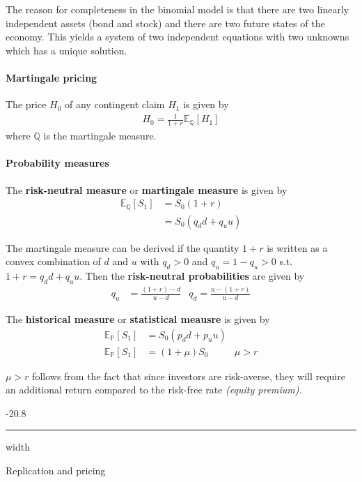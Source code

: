 \documentclass[a4paper,landscape,7pt,fleqn]{scrartcl}
\makeatletter
\renewcommand{\emph}[1]{\textbf{#1}}
\renewcommand{\subsubsection}{\@startsection{subsubsection}{1}{0mm}%
{-2\baselineskip}{0.8\baselineskip}%
{\hrule depth 0.2pt width\columnwidth\vspace*{1.2em}\normalsize\bfseries}}
\makeatother
\begin{document}
\begin{multicols*}{3}
The reason for completeness in the binomial model is that there are two linearly independent assets (bond and stock) and there are two future states of the economy. This yields a system of two independent equations with two unknowns which has a unique solution.

\paragraph{Martingale pricing}
The price $H_0$ of any contingent claim $H_1$ is given by
\begin{align*}
H_0 = \frac{1}{1+r} \mathbb{E}_\mathbb{Q}[H_1]
\end{align*}
where $\mathbb{Q}$ is the martingale measure.

\paragraph{Probability measures}
The \emph{risk-neutral measure} or \emph{martingale measure} is given by
\begin{align*}
\mathbb{E}_\mathbb{Q}[S_1] &= S_0 (1+r) \\
&= S_0 (q_d d + q_u u)
\end{align*}

The martingale measure can be derived if the quantity $1+r$ is written as a convex combination of $d$ and $u$ with $q_d > 0$ and $q_u = 1-q_u > 0$ s.t. $1+r = q_d d + q_u u$. Then the \emph{risk-neutral probabilities} are given by
\begin{align*}
q_u &= \frac{(1+r) - d}{u - d} & q_d = \frac{u - (1+r)}{u - d}
\end{align*}

The \emph{historical measure} or \emph{statistical meausre} is given by
\begin{align*}
\mathbb{E}_\mathbb{P}[S_1] &= S_0 (p_d d + p_u u) \\
\mathbb{E}_\mathbb{P}[S_1] &= (1+\mu) S_0 & \mu > r
\end{align*}

$\mu > r$ follows from the fact that since investors are risk-averse, they will require an additional return compared to the risk-free rate \textit{(equity premium).}

\subsubsection{Replication and pricing}


\end{multicols*}
\end{document}
